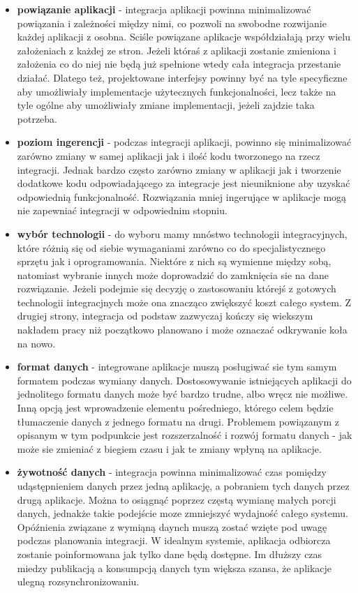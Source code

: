 \begin{itemize}
	\item \textbf{powiązanie aplikacji} - integracja aplikacji powinna minimalizować powiązania i zależności między nimi, co pozwoli na swobodne rozwijanie każdej aplikacji z osobna. Sciśle powiązane aplikacje współdziałają przy wielu założeniach z każdej ze stron. Jeżeli któraś z aplikacji zostanie zmieniona i założenia co do niej nie będą już spełnione wtedy cała integracja przestanie działać. Dlatego też, projektowane interfejsy powinny być na tyle specyficzne aby umożliwiały implementacje użytecznych funkcjonalności, lecz także na tyle ogólne aby umożliwiały zmiane implementacji, jeżeli zajdzie taka potrzeba.
	\item \textbf{poziom ingerencji} - podczas integracji aplikacji, powinno się minimalizować zarówno zmiany w samej aplikacji jak i ilość kodu tworzonego na rzecz integracji. Jednak bardzo często zarówno zmiany w aplikacji jak i tworzenie dodatkowe kodu odpowiadającego za integracje jest nieuniknione aby uzyskać odpowiednią funkcjonalność. Rozwiązania mniej ingerujące w aplikacje mogą nie zapewniać integracji w odpowiednim stopniu.
	\item \textbf{wybór technologii} - do wyboru mamy mnóstwo technologii integracyjnych, które różnią się od siebie wymaganiami zarówno co do specjalistycznego sprzętu jak i oprogramowania. Niektóre z nich są wymienne między sobą, natomiast wybranie innych może doprowadzić do zamknięcia sie na dane rozwiązanie. Jeżeli podejmie się decyzję o zastosowaniu którejś z gotowych technologii integracjnych może ona znacząco zwiększyć koszt całego system. Z drugiej strony, integracja od podstaw zazwyczaj kończy się wiekszym nakładem pracy niż początkowo planowano i może oznaczać odkrywanie koła na nowo.
	\item \textbf{format danych} - integrowane aplikacje muszą posługiwać sie tym samym formatem podczas wymiany danych. Dostosowywanie istniejących aplikacji do jednolitego formatu danych może być bardzo trudne, albo wręcz nie możliwe. Inną opcją jest wprowadzenie elementu pośredniego, którego celem będzie tłumaczenie danych z jednego formatu na drugi. Problemem powiązanym z opisanym w tym podpunkcie jest rozszerzalność i rozwój formatu danych - jak może sie zmieniać z biegiem czasu i jak te zmiany wpłyną na aplikacje.
	\item \textbf{żywotność danych} - integracja powinna minimalizować czas pomiędzy udąstępnieniem danych przez jedną aplikację, a pobraniem tych danych przez drugą aplikacje. Można to osiągnąć poprzez częstą wymianę małych porcji danych, jednakże takie podejście moze zmniejszyć wydajność całego systemu. Opóźnienia związane z wymiąną daynch muszą zostać wzięte pod uwagę podczas planowania integracji. W idealnym systemie, aplikacja odbiorcza zostanie poinformowana jak tylko dane będą dostępne. Im dłuższy czas miedzy publikacją a konsumpcją danych tym większa szansa, że aplikacje ulegną rozsynchronizowaniu.

\end{itemize}
